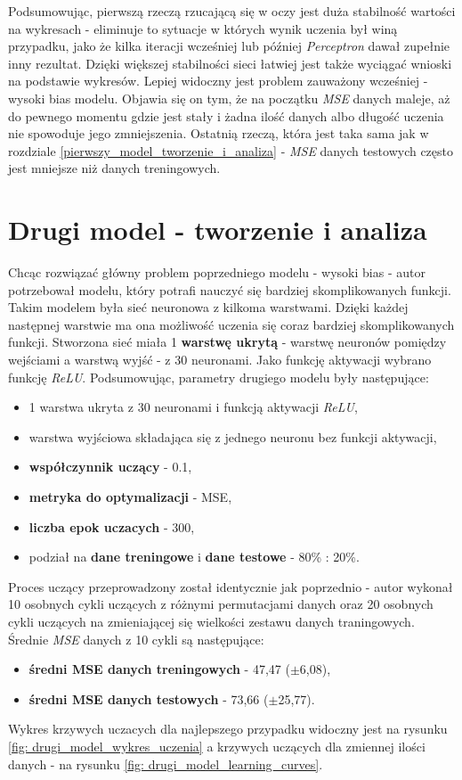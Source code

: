 \documentclass[12pt]{aghdpl}
\begin{document}
		Podsumowując, pierwszą rzeczą rzucającą się w oczy jest duża stabilność wartości na wykresach - eliminuje to sytuacje w których wynik uczenia był winą przypadku, jako że kilka iteracji wcześniej lub później \textit{Perceptron} dawał zupełnie inny rezultat. Dzięki większej stabilności sieci łatwiej jest także wyciągać wnioski na podstawie wykresów. Lepiej widoczny jest problem zauważony wcześniej - wysoki bias modelu. Objawia się on tym, że na początku \textit{MSE} danych maleje, aż do pewnego momentu gdzie jest stały i żadna ilość danych albo długość uczenia nie spowoduje jego zmniejszenia. Ostatnią rzeczą, która jest taka sama jak w rozdziale \ref{pierwszy_model_tworzenie_i_analiza} - \textit{MSE} danych testowych często jest mniejsze niż danych treningowych.
		
		\section{Drugi model - tworzenie i analiza} \label{drugi_model_tworzenie_i_analiza}
		Chcąc rozwiązać główny problem poprzedniego modelu - wysoki bias - autor potrzebował modelu, który potrafi nauczyć się bardziej skomplikowanych funkcji. Takim modelem była sieć neuronowa z kilkoma warstwami. Dzięki każdej następnej warstwie ma ona możliwość uczenia się coraz bardziej skomplikowanych funkcji. Stworzona sieć miała 1 \textbf{warstwę ukrytą} - warstwę neuronów pomiędzy wejściami a warstwą wyjść - z 30 neuronami. Jako funkcję aktywacji wybrano funkcję \textit{ReLU}.
		Podsumowując, parametry drugiego modelu były następujące:
		\begin{itemize}
			\item 1 warstwa ukryta z 30 neuronami i funkcją aktywacji \textit{ReLU},
			\item warstwa wyjściowa składająca się z jednego neuronu bez funkcji aktywacji,
			\item \textbf{współczynnik uczący} - 0.1,
			\item \textbf{metryka do optymalizacji} - MSE,
			\item \textbf{liczba epok uczacych} - 300,
			\item podział na \textbf{dane treningowe} i \textbf{dane testowe} - 80\% : 20\%.
		\end{itemize}
		
		Proces uczący przeprowadzony został identycznie jak poprzednio - autor wykonał 10 osobnych cykli uczących z różnymi permutacjami danych oraz 20 osobnych cykli uczących na zmieniającej się wielkości zestawu danych traningowych. Średnie \textit{MSE} danych z 10 cykli są następujące:
		\begin{itemize}
		\item \textbf{średni MSE danych treningowych} - 47,47 ($\pm$6,08),
		\item \textbf{średni MSE danych testowych} - 73,66 ($\pm$25,77).
		\end{itemize}
		Wykres krzywych uczacych dla najlepszego przypadku widoczny jest na rysunku \ref{fig: drugi_model_wykres_uczenia} a krzywych uczących dla zmiennej ilości danych - na rysunku \ref{fig: drugi_model_learning_curves}.
		
\end{document}
